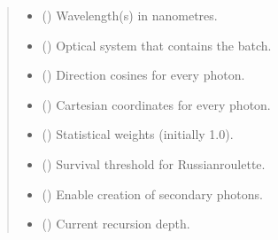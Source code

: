 \documentclass[letterpaper,10pt,english]{sphinxmanual}
\begin{document}
\begin{fulllineitems}
\begin{quote}
\begin{description}
\begin{itemize}
\item {} 
\sphinxAtStartPar
{} (\sphinxstyleliteralemphasis{\sphinxupquote{ | }}\sphinxstyleliteralemphasis{\sphinxupquote{{[}}}\sphinxstyleliteralemphasis{\sphinxupquote{{]}}}) \textendash{} Wavelength(s) in nanometres.

\item {} 
\sphinxAtStartPar
{} ({\hyperref[\detokenize{generated/photon_canon.optics:photon_canon.optics.System}]{}}) \textendash{} Optical system that contains the batch.

\item {} 
\sphinxAtStartPar
{} ({\hyperref[\detokenize{generated/photon_canon.optics:photon_canon.optics.IndexableProperty}]{}}) \textendash{} Direction cosines  for every photon.

\item {} 
\sphinxAtStartPar
{} () \textendash{} Cartesian coordinates  for every photon.

\item {} 
\sphinxAtStartPar
{} () \textendash{} Statistical weights (initially 1.0).

\item {} 
\sphinxAtStartPar
{} () \textendash{} Survival threshold for Russian\sphinxhyphen{}roulette.

\item {} 
\sphinxAtStartPar
{} () \textendash{} Enable creation of secondary photons.

\item {} 
\sphinxAtStartPar
{} () \textendash{} Current recursion depth.


\end{itemize}
\end{description}
\end{quote}
\end{fulllineitems}
\end{document}
